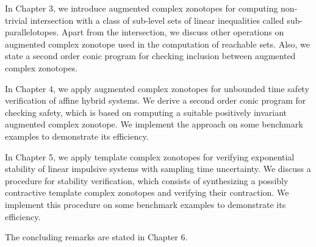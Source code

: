 \documentclass[11pt,a4paper,twoside,openright]{article}
\begin{document}
In Chapter 3,
we introduce augmented complex zonotopes for computing non-trivial
intersection with a class of sub-level sets of linear inequalities
called sub-parallelotopes.  Apart from the intersection, we discuss
other operations on augmented complex zonotope used in the computation
of reachable sets.  Also, we state a second order conic program for
checking inclusion between augmented complex zonotopes.

In Chapter 4, we apply augmented complex zonotopes for unbounded time
safety verification of affine hybrid systems.  We derive a second
order conic program for checking safety, which is based on computing a
suitable positively invariant augmented complex zonotope.  We
implement the approach on some benchmark examples to demonstrate its
efficiency.

In Chapter 5, we apply template complex zonotopes for verifying
exponential stability of linear impulsive systems with sampling time
uncertainty.  We discuss a procedure for stability verification, which
consists of synthesizing a possibly contractive template complex
zonotopes and verifying their contraction.  We implement this
procedure on some benchmark examples to demonstrate its efficiency.

The concluding remarks are stated in Chapter 6.










\end{document}
